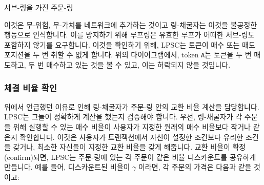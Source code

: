 \documentclass[UTF8,nofonts]{article}
\makeatletter
\newenvironment{figurehere}
 {\def\@captype{figure}}
 {}
\makeatother
\begin{document}
\begin{multicols}{2}
\begin{center}
\begin{figurehere}

\caption{서브-링을 가진 주문-링}
\label{fig:subring}
\end{figurehere}
\end{center}

이것은 무-위험, 무-가치를 네트워크에 추가하는 것이고 링-채굴자는 이것을 불공정한 행동으로 인식합니다. 이를 방지하기 위해 루프링은 유효한 루프가 어떠한 서브-링도 포함하지 않기를 요구합니다. 이것을 확인하기 위해, LPSC는 토큰이 매수 또는 매도 포지션을 두 번 취할 수 없게 합니다. 위의 다이어그램에서, token \verb|A|는 토큰을 두 번 매도하고, 두 번 매수하고 있는 것을 볼 수 있고, 이는 허락되지 않을 것입니다.      


\subsubsection{체결 비율 확인\label{sec:fill_rate_check}}

위에서 언급했던 이유로 인해 링-채굴자가 주문-링 안의 교환 비율 계산을 담당합니다. LPSC는 그들이 정확하게 계산을 했는지 검증해야 합니다. 우선, 링-채굴자가 각 주문을 위해 실행할 수 있는 매수 비율이 사용자가 지정한 원래의 매수 비율보다 작거나 같은지 확인합니다. 이것은 사용자가 트랜잭션에서 자신이 설정한 조건보다 유리한 조건을 갖거나, 최소한 자신들이 지정한 교환 비율을 갖게 해줍니다. 교환 비율이 확정(confirm)되면, LPSC는 주문-링에 있는 각 주문이 같은 비율 디스카운트를 공유하게 만듭니다. 예를 들어, 디스카운트된 비율이 $\gamma$ 이라면, 각 주문의 가격은 다음과 같을 것이고:    


\end{multicols}
\end{document}
